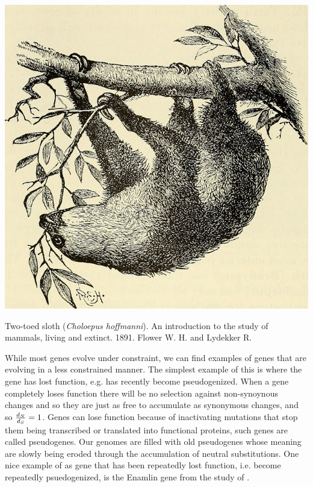 \begin{marginfigure}
\begin{center}
\includegraphics[width=\textwidth]{illustration_images/Genetic_drift/sloth/20423856040_6e4360df9c_z.jpg}
\end{center}
\caption{Two-toed sloth ({\it Choloepus hoffmanni}). An introduction
  to the study of mammals, living and extinct. 1891. Flower W. H. and Lydekker R.} \label{fig:sloth}  
\end{marginfigure} 

While most genes evolve under constraint, we can find examples of
genes that are evolving in a less constrained manner. The simplest
example of this is where the gene has lost function, e.g. has recently
become pseudogenized. When a gene completely loses function there will be no
selection against non-synoynous changes and so they are just as free
to accumulate as synonymous changes, and so $\frac{d_N}{d_S}=1$.
Genes can lose function because of inactivating mutations that stop
them being transcribed or translated into functional proteins, such genes are
called pseudogenes. Our genomes are filled with old pseudogenes whose
meaning are slowly being eroded through the accumulation of neutral substitutions.
One nice example of as gene that has been repeatedly lost function,
i.e. become repeatedly psuedogenized, is
the Enamlin gene from the study of \citeauthor{Meredith:09}.

